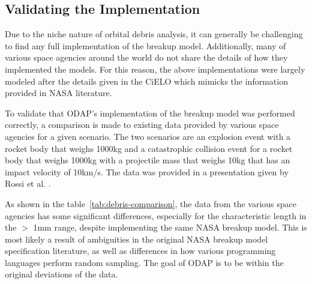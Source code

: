 \documentclass[a4paper, 12pt]{article}
\begin{document}
\newpage
\subsection{Validating the Implementation}
Due to the niche nature of orbital debris analysis, it can generally be challenging to find any full implementation of the breakup model. Additionally, many of various space agencies around the world do not share the details of how they implemented the models. For this reason, the above implementations were largely modeled after the details given in the CiELO \cite{letizia_space_2016} which mimicks the information provided in NASA literature.

To validate that ODAP's implementation of the breakup model was performed correctly, a comparison is made to existing data provided by various space agencies for a given scenario. The two scenarios are an explosion event with a rocket body that weighs 1000kg and a catastrophic collision event for a rocket body that weighs 1000kg with a projectile mass that weighs 10kg that has an impact velocity of 10km/s. The data was provided in a presentation given by Rossi et al. \citep{rossi_nasa_nodate}.

As shown in the table~\ref{tab:debris-comparison}, the data from the various space agencies has some significant differences, especially for the characteristic length in the $>$ 1mm range, despite implementing the same NASA breakup model. This is most likely a result of ambiguities in the original NASA breakup model specification literature, as well as differences in how various programming languages perform random sampling. The goal of ODAP is to be within the original deviations of the data.
\end{document}
